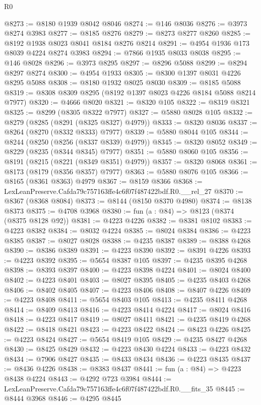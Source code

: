 \begin{lexlean}{R0}
\begin{coremodule}
@8273 := @8180 @1939 @8042 @8046
@8274 := @146 @8036
@8276 := @3973 @8274 @3983
@8277 := @8185 @8276
@8279 := @8273 @8277 @8260
@8285 := @8192 @1938 @8023 @8041 @8184 @8276 @8214
@8291 := @4954 @1936 @173 @8039 @4224 @8274 @3983
@8294 := @7866 @1935 @8033 @8038
@8295 := @146 @8028
@8296 := @3973 @8295
@8297 := @8296 @5088
@8299 := @8294 @8297 @8274
@8300 := @4954 @1933
@8305 := @8300 @1397 @8031 @4226 @8295 @5088
@8308 := @8180 @1932 @8025 @8030
@8309 := @8185 @5088
@8319 := @8308 @8309 @8295 (@8192 @1397 @8023 @4226 @8184 @5088 @8214 @7977)
@8320 := @4666 @8020
@8321 := @8320 @105
@8322 := @8319 @8321
@8325 := @8299 (@8305 @8322 @7977)
@8327 := @5880 @8028 @105
@8332 := @8279 (@8285 (@8291 (@8325 @8327) @4979))
@8333 := @8320 @8036
@8337 := @8264 (@8270 (@8332 @8333) @7977)
@8339 := @5880 @8044 @105
@8344 := @8244 (@8250 (@8256 (@8337 @8339) @4979))
@8345 := @8320 @8052
@8349 := @8229 (@8235 (@8344 @8345) @7977)
@8351 := @5880 @8060 @105
@8356 := @8191 (@8215 (@8221 (@8349 @8351) @4979))
@8357 := @8320 @8068
@8361 := @8173 (@8179 (@8356 @8357) @7977)
@8363 := @5880 @8076 @105
@8366 := @8165 (@8361 @8363) @4979
@8367 := @8159 @8366
@8368 := LexLeanPreserve.Cafda79c757163ffe4c6f07f487422bdf.R0.__rel_27
@8370 := @8367 (@8368 @8084)
@8373 := @8144 (@8150 @8370 @4980)
@8374 := @8138 @8373
@8375 := @4708 @3968
@8380 := fun (a : @84) => @8123 (@8374 (@8375 @8128 @92))
@8381 := @4223 @4226
@8382 := @8381 @8102
@8383 := @4223 @8382
@8384 := @8032 @4224
@8385 := @8024 @8384
@8386 := @4223 @8385
@8387 := @8027 @8028
@8388 := @4235 @8387
@8389 := @8388 @4268
@8390 := @8386 @8389
@8391 := @4223 @8390
@8392 := @8391 @4226
@8393 := @4223 @8392
@8395 := @5654 @8387 @105
@8397 := @4235 @8395 @4268
@8398 := @8393 @8397
@8400 := @4223 @8398 @4224
@8401 := @8024 @8400
@8402 := @4223 @8401
@8403 := @8027 @8395
@8405 := @4235 @8403 @4268
@8406 := @8402 @8405
@8407 := @4223 @8406
@8408 := @8407 @4226
@8409 := @4223 @8408
@8411 := @5654 @8403 @105
@8413 := @4235 @8411 @4268
@8414 := @8409 @8413
@8416 := @4223 @8414 @4224
@8417 := @8024 @8416
@8418 := @4223 @8417
@8419 := @8027 @8411
@8421 := @4235 @8419 @4268
@8422 := @8418 @8421
@8423 := @4223 @8422
@8424 := @8423 @4226
@8425 := @4223 @8424
@8427 := @5654 @8419 @105
@8429 := @4235 @8427 @4268
@8430 := @8425 @8429
@8432 := @4223 @8430 @4224
@8433 := @4223 @8432
@8434 := @7906 @8427
@8435 := @8433 @8434
@8436 := @4223 @8435
@8437 := @8436 @4226
@8438 := @8383 @8437
@8441 := fun (a : @84) => @4223 @8438 @4224
@8443 := @4292 @723 @3984
@8444 := LexLeanPreserve.Cafda79c757163ffe4c6f07f487422bdf.R0.__fits_35
@8445 := @8444 @3968
@8446 := @4295 @8445

\end{coremodule}
\end{lexlean}
